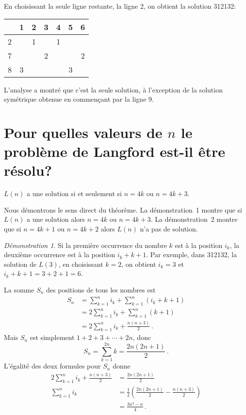 En choisissant la seule ligne restante, la ligne 2, on obtient la solution 3{}1{}2{}1{}3{}2:
\begin{center}
\addtolength{\tabcolsep}{4pt}
\begin{tabular}{|c||c|c|c|c|c|c|}
\hline
&1&2&3&4&5&6\\\hline\hline
2&&1&&1&&\\\hline
7&&&2&&&2\\\hline
8&3&&&&3&\\\hline
\end{tabular}
\end{center}
L'analyse a montré que c'est la seule solution, à l'exception de la solution symétrique obtenue en commençant par la ligne 9.

\section{Pour quelles valeurs de $n$ le problème de Langford est-il être résolu?}\label{s.langford-theorem}

\begin{theorem} \label{thm.langford}
$L(n)$ a une solution si et seulement si $n=4k$ ou $n=4k+3$.
\end{theorem}

Nous démontrons le sens direct du théorème. La démonstration~1 montre que si $L(n)$ a une solution alors $n=4k$ ou $n=4k+3$. La démonstration~2 montre que si $n=4k+1$ ou $n=4k+2$ alors $L(n)$ n'a pas de solution.

\noindent \emph{Démonstration 1}. Si la première occurrence du nombre $k$ est à la position $i_k$, la deuxième occurrence est à la position $i_k+k+1$. Par exemple, dans 3{}1{}2{}1{}3{}2, la solution de $L(3)$, en choisissant $k=2$, on obtient $i_k=3$ et $i_k+k+1=3+2+1=6$.

 La somme $S_n$ des positions de tous les nombres est 
\begin{align*}
S_n&=\sum_{k=1}^{n}i_k+\sum_{k=1}^{n}(i_k+k+1)\\
& = 2\sum_{k=1}^{n}i_k+\sum_{k=1}^{n}(k+1)\\
&= 2\sum_{k=1}^{n}i_k+\frac{n(n+3)}{2}\,.
\end{align*}
Mais $S_n$ est simplement $1+2+3+\cdots+2n$, donc 
\[
S_n=\sum_{k=1}^{2n}k = \frac{2n(2n+1)}{2}\,.
\]
L'égalité des deux formules pour $S_n$ donne 
\begin{align*}
2\sum_{k=1}^{n}i_k+\frac{n(n+3)}{2} &= \frac{2n(2n+1)}{2}\\
\sum_{k=1}^{n}i_k &= \frac{1}{2}\left(\frac{2n(2n+1)}{2} - \frac{n(n+3)}{2}\right) \\
&= \frac{3n^2-n}{4}\,.
\end{align*}

